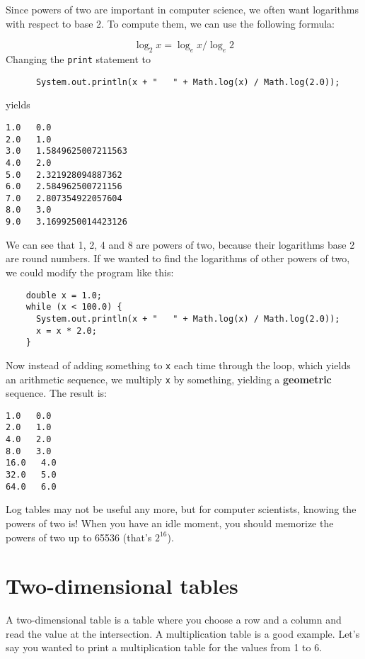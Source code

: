 \documentclass[12pt]{book}
\theoremstyle{definition}
\begin{document}
Since powers of two are important
in computer science, we often want logarithms with
respect to base 2.  To compute them, we can use the following
formula:

\begin{equation}
\log_2 x = \log_e x / \log_e 2
\end{equation}
%
Changing the {\tt print} statement to

\begin{lstlisting}
      System.out.println(x + "   " + Math.log(x) / Math.log(2.0));
\end{lstlisting}
%
yields

\begin{lstlisting}
1.0   0.0
2.0   1.0
3.0   1.5849625007211563
4.0   2.0
5.0   2.321928094887362
6.0   2.584962500721156
7.0   2.807354922057604
8.0   3.0
9.0   3.1699250014423126
\end{lstlisting}
%
We can see that 1, 2, 4 and 8 are powers of two, because
their logarithms base 2 are round numbers.  If we wanted to find
the logarithms of other powers of two, we could modify the
program like this:

\begin{lstlisting}
    double x = 1.0;
    while (x < 100.0) {
      System.out.println(x + "   " + Math.log(x) / Math.log(2.0));
      x = x * 2.0;
    }
\end{lstlisting}
%
Now instead of adding something to {\tt x} each time through
the loop, which yields an arithmetic sequence, we multiply
{\tt x} by something, yielding a {\bf geometric} sequence.
The result is:

\begin{lstlisting}
1.0   0.0
2.0   1.0
4.0   2.0
8.0   3.0
16.0   4.0
32.0   5.0
64.0   6.0
\end{lstlisting}
%
Log tables may not be useful any more, but for computer scientists,
knowing the powers of two is!  When you have an idle
moment, you should memorize the powers of two up to 65536
(that's $2^{16}$).


\section{Two-dimensional tables}

A two-dimensional table is a table where you choose a row and
a column and read the value at the intersection.  A multiplication
table is a good example.  Let's say you wanted to print a
multiplication table for the values from 1 to 6.
\end{document}

